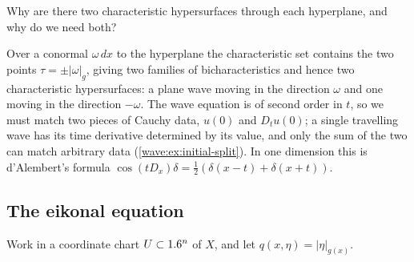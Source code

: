\begin{question}
Why are there two characteristic hypersurfaces through each hyperplane, and why do we
need both?
\end{question}
\begin{answer}
Over a conormal $\omega\,dx$ to the hyperplane the characteristic set contains the
two points $\tau=\pm|\omega|_g$, giving two families of bicharacteristics and hence two
characteristic hypersurfaces: a plane wave moving in the direction $\omega$ and one
moving in the direction $-\omega$. The wave equation is of second order in $t$, so we
must match two pieces of Cauchy data, $u(0)$ and $D_tu(0)$; a single travelling wave
has its time derivative determined by its value, and only the sum of the two
can match arbitrary data (\cref{wave:ex:initial-split}). In one dimension this is
d'Alembert's formula $\cos(tD_x)\delta=\frac12(\delta(x-t)+\delta(x+t))$.
\end{answer}

\subsection{The eikonal equation}

Work in a coordinate chart $U\subset1.6^n$ of $X$, and let $q(x,\eta)=|\eta|_{g(x)}$.

